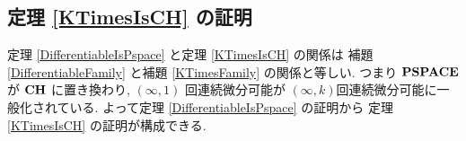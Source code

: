 \subsection{定理 \ref{KTimesIsCH} の証明}

定理 \ref{DifferentiableIsPspace} と定理 \ref{KTimesIsCH} の関係は
補題 \ref{DifferentiableFamily} と補題 \ref{KTimesFamily} の関係と等しい.
つまり $\mathbf{PSPACE}$ が $\mathbf{CH}$ に置き換わり,
$(\infty, 1)$ 回連続微分可能が $(\infty, k)$回連続微分可能に一般化されている.
よって定理 \ref{DifferentiableIsPspace} の証明から
定理 \ref{KTimesIsCH} の証明が構成できる.

